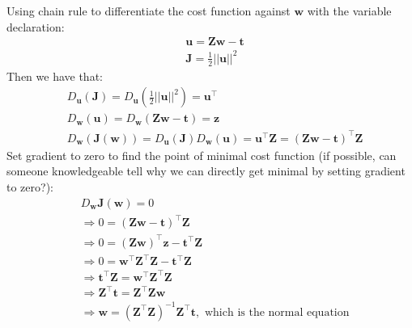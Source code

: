 \documentclass[11pt]{article}
\theoremstyle{plain}
\theoremstyle{definition}
\begin{document}
Using chain rule to differentiate the cost function against $\mathbf{w}$ with the variable declaration:
\begin{align*}
& \mathbf{ u = Zw -t }\\
& \mathbf{J} = \frac{1}{2} ||\mathbf{u}||^2
\end{align*}
Then we have that: \begin{align*}
&D_\mathbf{u}(\mathbf{J}) = D_\mathbf{u} (\frac{1}{2}||\mathbf{u}||^2) = \mathbf{u^\top}     \\
&D_\mathbf{w} (\mathbf{u}) = D_\mathbf{w}(\mathbf{Zw -t}) = \mathbf{z}\\
&D_\mathbf{w} (\mathbf{J}(\mathbf{w})) = D_\mathbf{u}(\mathbf{J})D_\mathbf{w}(\mathbf{u}) = \mathbf{u^\top Z} = \mathbf{(Zw-t)^\top Z}
\end{align*}
Set gradient to zero to find the point of minimal cost function (if possible, can someone knowledgeable tell why we can directly get minimal by setting gradient to zero?): 
\begin{align*}
&D_\mathbf{w} \mathbf{J}(\mathbf{w}) = 0 \\
&\Longrightarrow 0 = \mathbf{(Zw-t)^\top Z} \\
&\Longrightarrow 0 = \mathbf{(Zw)^\top z - t^\top Z} \\
&\Longrightarrow 0 = \mathbf{w^\top Z^\top Z - t^\top Z} \\
&\Longrightarrow \mathbf{t^\top Z = w^\top Z^\top Z}\\
&\Longrightarrow \mathbf{Z^\top t = Z^\top Z w} \\
&\Longrightarrow \mathbf{w} = \mathbf{(Z^\top Z)}^{-1} \mathbf{Z^\top t}, \text{ which is the normal equation} 
\end{align*}
\end{document}
